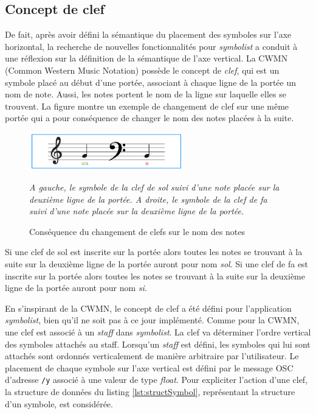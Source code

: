 \subsection{Concept de clef}
\label{subsec:conceptDeClef}
De fait, après avoir défini la sémantique du placement des symboles sur l'axe horizontal, la recherche de nouvelles fonctionnalités pour \textit{symbolist} a conduit à une réflexion sur la définition de la sémantique de l'axe vertical.
La CWMN (Common Western Music Notation) possède le concept de \textit{clef}, qui est un symbole placé au début d'une portée, associant à chaque ligne de la portée un nom de note.
Aussi, les notes portent le nom de la ligne sur laquelle elles se trouvent.
La figure montre un exemple de changement de clef sur une même portée qui a pour conséquence de changer le nom des notes placées à la suite.
\begin{figure}[H]
	\centering
	\includegraphics[keepaspectratio=true, width=0.6\textwidth]{ModeleDeNotation/i/clefsCWMN.png}
	\caption{Conséquence du changement de clefs sur le nom des notes}
	\label{fig:clefsCWMN}
	\small
	\textit{A gauche, le symbole de la clef de sol suivi d'une note placée sur la deuxième ligne de la portée. A droite, le symbole de la clef de fa suivi d'une note placée sur la deuxième ligne de la portée.}
\end{figure}
Si une clef de sol est inscrite sur la portée alors toutes les notes se trouvant à la suite sur la deuxième ligne de la portée auront pour nom \textit{sol}. Si une clef de fa est inscrite sur la portée alors toutes les notes se trouvant à la suite sur la deuxième ligne de la portée auront pour nom \textit{si}.

En s'inspirant de la CWMN, le concept de clef a été défini pour l'application \textit{symbolist}, bien qu'il ne soit pas à ce jour implémenté. Comme pour la CWMN, une clef est associé à un \textit{staff} dans \textit{symbolist}. La clef va déterminer l'ordre vertical des symboles attachés au staff. Lorsqu'un \textit{staff} est défini, les symboles qui lui sont attachés sont ordonnés verticalement de manière arbitraire par l'utilisateur. Le placement de chaque symbole sur l'axe vertical est défini par le message OSC d'adresse \texttt{/y} associé à une valeur de type \textit{float}. 
Pour expliciter l'action d'une clef, la structure de données du listing \ref{lst:structSymbol}, représentant la structure d'un symbole, est considérée.

